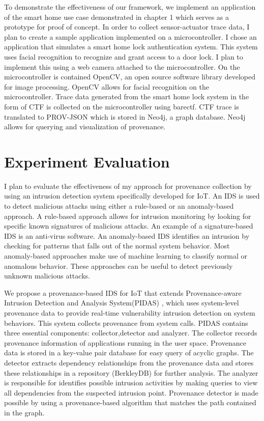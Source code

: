 To demonstrate the effectiveness of our framework, we implement an application of the smart home use case demonstrated in chapter 1 which serves as a prototype for proof of concept. In order to collect sensor-actuator trace data, I plan to create a sample application implemented on a microcontroller. I chose an application that simulates a smart home lock authentication system. This system uses facial recognition to recognize and grant access to a door lock. I plan to implement this using a web camera attached to the microcontroller. On the microcontroller is contained OpenCV, an open source software library developed for image processing. OpenCV allows for facial recognition on the microcontroller. Trace data generated from the smart home lock system in the form of CTF is collected on the microcontroller using barectf. CTF trace is translated to PROV-JSON which is stored in Neo4j, a graph database. Neo4j allows for querying and visualization of provenance. 




\section{Experiment Evaluation}

I plan to evaluate the effectiveness of my approach for provenance collection by using an intrusion detection system specifically developed for IoT. An IDS is used to detect malicious attacks using either a rule-based or an anomaly-based approach. A rule-based approach allows for intrusion monitoring by looking for specific known signatures of malicious attacks. An example of a signature-based IDS is an anti-virus software. An anomaly-based IDS identifies an intrusion by checking for patterns that falls out of the normal system behavior. Most anomaly-based approaches make use of machine learning to classify normal or anomalous behavior. These approaches can be useful to detect previously unknown malicious attacks. 
\par We propose a provenance-based IDS for IoT that extends Provenance-aware Intrusion Detection and Analysis System(PIDAS) \cite{Xie:2016:UID:2936026.2936232}, which uses system-level provenance data to provide real-time vulnerability intrusion detection on system behaviors. This system collects provenance from system calls. PIDAS contains three essential components: collector,detector and analyzer. The collector records provenance information of applications running in the user space. Provenance data is stored in a key-value pair database for easy query of acyclic graphs. The detector extracts dependency relationships from the provenance data and stores these relationships in a repository (BerkleyDB) for further analysis. The analyzer is responsible for identifies possible intrusion activities by making queries to view all dependencies from the suspected intrusion point. Provenance detector is made possible by using a provenance-based algorithm that matches the path contained in the graph.


